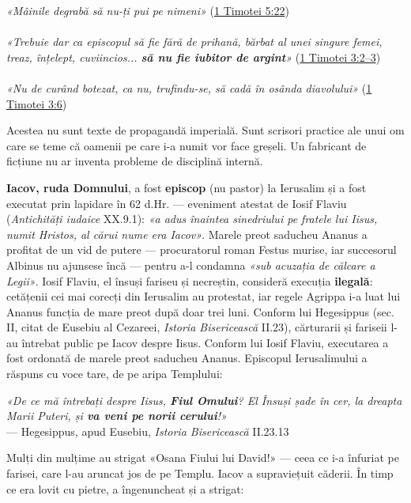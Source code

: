\documentclass[12pt,a4paper,twoside,openany]{book}
\begin{document}
\begin{biblequote}
\textit{«Mâinile degrabă să nu-ți pui pe nimeni»} (\href{https://bibliaortodoxa.ro/carte.php?id=78\&cap=5\#22}{1 Timotei 5:22}) \\
 \\

\textit{«Trebuie dar ca episcopul să fie fără de prihană, bărbat al unei singure femei, treaz, înțelept, cuviincios... \textbf{să nu fie iubitor de argint}»} (\href{https://bibliaortodoxa.ro/carte.php?id=78\&cap=3\#2}{1 Timotei 3:2–3}) \\
 \\

\textit{«Nu de curând botezat, ca nu, trufindu-se, să cadă în osânda diavolului»} (\href{https://bibliaortodoxa.ro/carte.php?id=78\&cap=3\#6}{1 Timotei 3:6})
\end{biblequote}
Acestea nu sunt texte de propagandă imperială. Sunt scrisori practice ale unui om care se teme că oamenii pe care i-a numit vor face greșeli. Un fabricant de ficțiune nu ar inventa probleme de disciplină internă.

\textbf{Iacov, ruda Domnului}, a fost \textbf{episcop} (nu pastor) la Ierusalim și a fost executat prin lapidare în 62 d.Hr. — eveniment atestat de Iosif Flaviu (\textit{Antichități iudaice} XX.9.1): \textit{«a adus înaintea sinedriului pe fratele lui Iisus, numit Hristos, al cărui nume era Iacov»}. Marele preot saducheu Ananus a profitat de un vid de putere — procuratorul roman Festus murise, iar succesorul Albinus nu ajunsese încă — pentru a-l condamna \textit{«sub acuzația de călcare a Legii»}. Iosif Flaviu, el însuși fariseu și necreștin, consideră execuția \textbf{ilegală}: cetățenii cei mai corecți din Ierusalim au protestat, iar regele Agrippa i-a luat lui Ananus funcția de mare preot după doar trei luni. Conform lui Hegesippus (sec. II, citat de Eusebiu al Cezareei, \textit{Istoria Bisericească} II.23), cărturarii și fariseii l-au întrebat public pe Iacov despre Iisus. Conform lui Iosif Flaviu, executarea a fost ordonată de marele preot saducheu Ananus. Episcopul Ierusalimului a răspuns cu voce tare, de pe aripa Templului:


\begin{biblequote}
\textit{«De ce mă întrebați despre Iisus, \textbf{Fiul Omului}? El Însuși șade în cer, la dreapta Marii Puteri, și \textbf{va veni pe norii cerului}!»} \\
{\small\color{gray}— Hegesippus, apud Eusebiu, \textit{Istoria Bisericească} II.23.13}
\end{biblequote}
Mulți din mulțime au strigat «Osana Fiului lui David!» — ceea ce i-a înfuriat pe farisei, care l-au aruncat jos de pe Templu. Iacov a supraviețuit căderii. În timp ce era lovit cu pietre, a îngenuncheat și a strigat:
\end{document}
